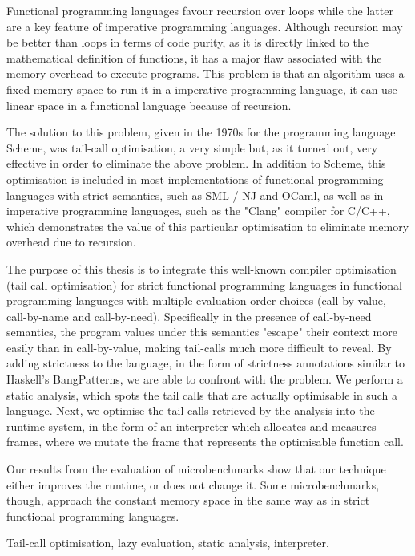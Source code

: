 \documentclass[diploma]{softlab-thesis}
\begin{document}


\begin{abstracten}%
  Functional programming languages favour recursion over loops
  while the latter are a key feature of imperative programming languages. Although recursion may 
  be better than loops in terms of code purity, as it is directly linked to the mathematical definition
  of functions, it has a major flaw associated with the memory overhead to execute
  programs. This problem is that an algorithm uses a fixed memory space to run it
  in a imperative programming language, it can use linear space in a functional language because
  of recursion.
  
  
  The solution to this problem, given in the 1970s for the programming language Scheme, was tail-call 
  optimisation, a very simple but, as it turned out, very effective in order to eliminate the above 
  problem.
  In addition to Scheme, this optimisation is included in most implementations of functional programming 
  languages with strict semantics, such as SML / NJ and OCaml, as well as in imperative programming 
  languages, such as the "Clang" compiler for C/C++, which demonstrates the value of this particular
  optimisation to eliminate memory overhead due to recursion.
  
  The purpose of this thesis is to integrate this well-known compiler optimisation
  (tail call optimisation) for strict functional programming languages in
  functional programming languages with multiple evaluation order choices (call-by-value, call-by-name and
  call-by-need). Specifically in the presence of call-by-need semantics, the program values under this 
  semantics "escape" their context more easily than in call-by-value, making tail-calls much more 
  difficult to reveal. By adding strictness to the language, in the form of strictness annotations 
  similar to Haskell's BangPatterns, we are able to confront with the problem. We perform a static 
  analysis, which spots the tail calls that are actually optimisable in such a language. Next, we 
  optimise the tail calls retrieved by the analysis into the runtime system, 
  in the form of an interpreter which allocates and measures frames, 
  where we mutate the frame that represents the optimisable function call.

  Our results from the evaluation of microbenchmarks show that our technique either improves 
  the runtime, or does not change it. Some microbenchmarks, though, approach the constant 
  memory space in the same way as in strict functional programming languages.
  

\begin{keywordsen}
Tail-call optimisation, lazy evaluation, static analysis, interpreter. 
\end{keywordsen}
\end{abstracten}
\end{document}
